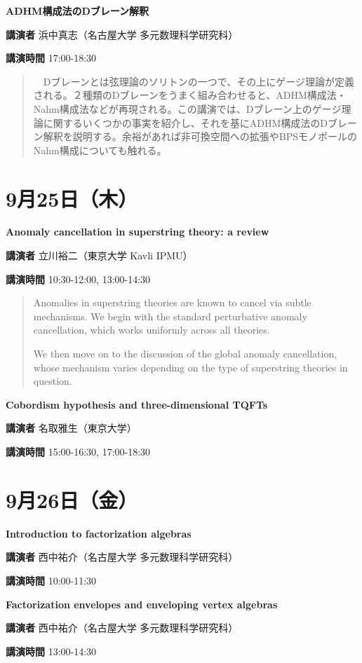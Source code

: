 \documentclass{ltjsarticle}
\theoremstyle{mystyle} %
\numberwithin{equation}{section}
\newcommand{\spkB}{浜中真志}
\newcommand{\spkC}{立川裕二}
\newcommand{\spkD}{名取雅生}
\newcommand{\spkE}{西中祐介}
\newcommand{\instB}{名古屋大学 多元数理科学研究科}
\newcommand{\instC}{東京大学 Kavli IPMU}
\newcommand{\instD}{東京大学}
\newcommand{\instE}{名古屋大学 多元数理科学研究科}
\newcommand{\titleBB}{ADHM構成法のDブレーン解釈}
\newcommand{\titleC}{Anomaly cancellation in superstring theory: a review}
\newcommand{\titleD}{Cobordism hypothesis and three-dimensional TQFTs}
\newcommand{\titleE}{Introduction to factorization algebras}
\newcommand{\titleEE}{Factorization envelopes and enveloping vertex algebras}
\newcommand{\abst}[5]{
    \Large
    \textbf{#1}
    \normalsize
    
    \vspace{10pt}

    \textbf{講演者} #2（#3）

    \textbf{講演時間} #4

    \vspace{5pt}

    \begin{quote}
        #5
    \end{quote}

    \vspace{10pt}
}
\begin{document}
\abst{\titleBB}{\spkB}{\instB}{17:00-18:30}{
    　Dブレーンとは弦理論のソリトンの一つで、その上にゲージ理論が定義される。２種類のDブレーンをうまく組み合わせると、ADHM構成法・Nahm構成法などが再現される。この講演では、Dブレーン上のゲージ理論に関するいくつかの事実を紹介し、それを基にADHM構成法のDブレーン解釈を説明する。余裕があれば非可換空間への拡張やBPSモノポールのNahm構成についても触れる。
}

\newpage

\section*{9月25日（木）}

\abst{\titleC}{\spkC}{\instC}{10:30-12:00, 13:00-14:30}{
    \phantom{AA}Anomalies in superstring theories are known to cancel via subtle mechanisms. We begin with the standard perturbative anomaly cancellation, which works uniformly across all theories.
    
    \phantom{AA}We then move on to the discussion of the global anomaly cancellation, whose mechanism varies depending on the type of superstring theories in question.
}

\abst{\titleD}{\spkD}{\instD}{15:00-16:30, 17:00-18:30}{
}

\newpage

\section*{9月26日（金）}

\abst{\titleE}{\spkE}{\instE}{10:00-11:30}{
}

\abst{\titleEE}{\spkE}{\instE}{13:00-14:30}{
}
\end{document}
